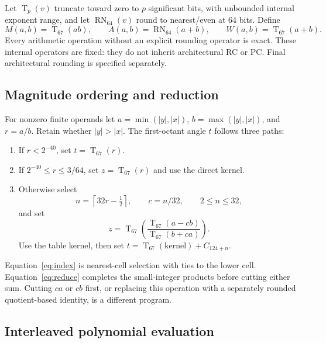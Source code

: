 \documentclass[11pt]{article}
\newcommand{\T}[1]{\operatorname{T}_{#1}}
\newcommand{\N}{\operatorname{RN}_{64}}
\begin{document}
Let $\T{p}(v)$ truncate toward zero to $p$ significant bits, with unbounded
internal exponent range, and let $\N(v)$ round to nearest/even at 64 bits.
Define
\begin{equation}
 M(a,b)=\T{67}(ab),\qquad
 A(a,b)=\N(a+b),\qquad
 W(a,b)=\T{67}(a+b).
 \label{eq:ops}
\end{equation}
Every arithmetic operation without an explicit rounding operator is exact.
These internal operators are fixed: they do not inherit architectural RC
or PC. Final architectural rounding is specified separately.

\subsection{Magnitude ordering and reduction}

For nonzero finite operands let $a=\min(|y|,|x|)$,
$b=\max(|y|,|x|)$, and $r=a/b$. Retain whether $|y|>|x|$.
The first-octant angle $t$ follows three paths:
\begin{enumerate}
\item If $r<2^{-40}$, set $t=\T{67}(r)$.
\item If $2^{-40}\le r\le3/64$, set $z=\T{67}(r)$ and use the direct kernel.
\item Otherwise select
\begin{equation}
 n=\left\lceil32r-\tfrac12\right\rceil,\qquad c=n/32,\qquad 2\le n\le32,
 \label{eq:index}
\end{equation}
and set
\begin{equation}
 z=\T{67}\!\left(\frac{\T{67}(a-cb)}{\T{67}(b+ca)}\right).
 \label{eq:reduce}
\end{equation}
Use the table kernel, then set $t=\T{67}(\mathrm{kernel})+C_{124+n}$.
\end{enumerate}
Equation~\eqref{eq:index} is nearest-cell selection with ties to the lower
cell. Equation~\eqref{eq:reduce} completes the small-integer products before
cutting either sum. Cutting $ca$ or $cb$ first, or replacing this operation
with a separately rounded quotient-based identity, is a different program.

\subsection{Interleaved polynomial evaluation}
\end{document}
